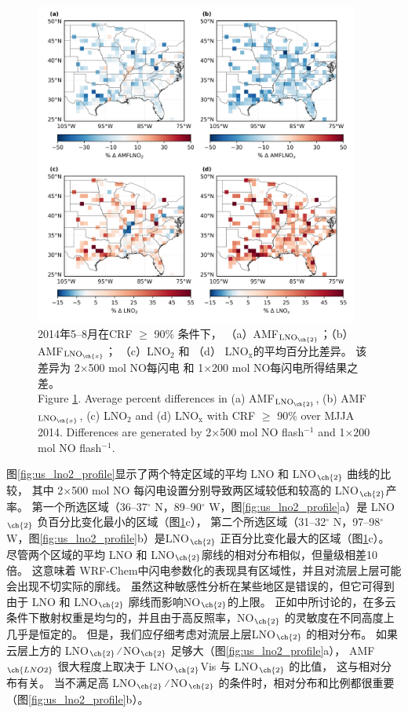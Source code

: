 \begin{figure}[H]
\centering
\includegraphics[width=0.95\textwidth]{./figures/us_simulation_diff.png}
\caption{2014年5--8月在CRF $\geq$ 90\% 条件下，
（a）AMF$_{\textrm{LNO$_{\ch{2}}$}}$；（b）AMF$_{\textrm{LNO$_{\ch{x}}$}}$；
（c）LNO$_\textrm{2}$ 和 （d） LNO$_\textrm{x}$的平均百分比差异。
该差异为 2$\times$500 mol NO每闪电 和 1$\times$200 mol NO每闪电所得结果之差。\\
Figure \ref{fig:us_simulation_diff}. Average percent differences in (a) AMF$_{\textrm{LNO$_{\ch{2}}$}}$, (b) AMF$_{\textrm{LNO$_{\ch{x}}$}}$, (c) LNO$_\textrm{2}$ and (d) LNO$_\textrm{x}$ with CRF $\geq$ 90\% over MJJA 2014.
Differences are generated by 2$\times$500 mol NO flash$^{-1}$ and 1$\times$200 mol NO flash$^{-1}$.}
\label{fig:us_simulation_diff}
\end{figure}


图\ref{fig:us_lno2_profile}显示了两个特定区域的平均 LNO 和 LNO$_{\ch{2}}$ 曲线的比较，
其中 2$\times$500 mol NO 每闪电设置分别导致两区域较低和较高的 LNO$_{\ch{2}}$产率。
第一个所选区域（36--37$^{\circ}$ N，89--90$^{\circ}$ W，图\ref{fig:us_lno2_profile}a）是 LNO$_{\ch{2}}$ 负百分比变化最小的区域（图\ref{fig:us_simulation_diff}c），
第二个所选区域（31--32$^{\circ}$ N，97--98$^{\circ}$ W，图\ref{fig:us_lno2_profile}b）是LNO$_{\ch{2}}$ 正百分比变化最大的区域（图\ref{fig:us_simulation_diff}c）。
尽管两个区域的平均 LNO 和 LNO$_{\ch{2}}$廓线的相对分布相似，但量级相差10 倍。
这意味着 WRF-Chem中闪电参数化的表现具有区域性，并且对流层上层可能会出现不切实际的廓线。
虽然这种敏感性分析在某些地区是错误的，但它可得到由于 LNO 和 LNO$_{\ch{2}}$ 廓线而影响NO$_{\ch{2}}$的上限。
正如\citet{Laughner.2017}中所讨论的，在多云条件下散射权重是均匀的，并且由于高反照率，NO$_{\ch{2}}$ 的灵敏度在不同高度上几乎是恒定的。
但是，我们应仔细考虑对流层上层LNO$_{\ch{2}}$ 的相对分布。
如果云层上方的 LNO$_{\ch{2}}$ ∕ NO$_{\ch{2}}$ 足够大（图\ref{fig:us_lno2_profile}a），
AMF$_{\ch{LNO2}}$ 很大程度上取决于 LNO$_{\ch{2}}$Vis 与 LNO$_{\ch{2}}$ 的比值，
这与相对分布有关。
当不满足高 LNO$_{\ch{2}}$ ∕ NO$_{\ch{2}}$ 的条件时，相对分布和比例都很重要（图\ref{fig:us_lno2_profile}b）。


